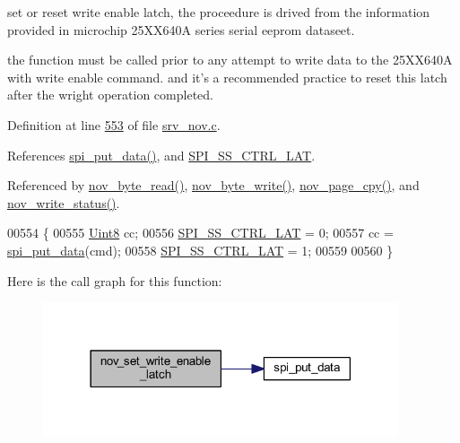 set or reset write enable latch, the proceedure is drived from the information provided in microchip 25\+X\+X640\+A series serial eeprom dataseet. 

the function must be called prior to any attempt to write data to the 25\+X\+X640\+A with write enable command. and it's a recommended practice to reset this latch after the wright operation completed. 

Definition at line \hyperlink{a00060_source_l00553}{553} of file \hyperlink{a00060_source}{srv\+\_\+nov.\+c}.



References \hyperlink{a00032_source_l00097}{spi\+\_\+put\+\_\+data()}, and \hyperlink{a00013_source_l00110}{S\+P\+I\+\_\+\+S\+S\+\_\+\+C\+T\+R\+L\+\_\+\+L\+A\+T}.



Referenced by \hyperlink{a00060_source_l00633}{nov\+\_\+byte\+\_\+read()}, \hyperlink{a00060_source_l00608}{nov\+\_\+byte\+\_\+write()}, \hyperlink{a00060_source_l00663}{nov\+\_\+page\+\_\+cpy()}, and \hyperlink{a00060_source_l00586}{nov\+\_\+write\+\_\+status()}.


\begin{DoxyCode}
00554 \{
00555     \hyperlink{a00072_af84840501dec18061d18a68c162a8fa2}{Uint8} cc;
00556     \hyperlink{a00013_aa8b53e04161d178ebd9c01edf1584039}{SPI\_SS\_CTRL\_LAT} = 0;
00557     cc = \hyperlink{a00013_a19e2dff580e4d1b2198fa9108fca81ac}{spi\_put\_data}(cmd);
00558     \hyperlink{a00013_aa8b53e04161d178ebd9c01edf1584039}{SPI\_SS\_CTRL\_LAT} = 1;
00559 
00560 \}
\end{DoxyCode}


Here is the call graph for this function\+:
\nopagebreak
\begin{figure}[H]
\begin{center}
\leavevmode
\includegraphics[width=297pt]{d9/d73/a00060_a7b698f4b0088c4e28951c2204b7b821e_cgraph}
\end{center}
\end{figure}




